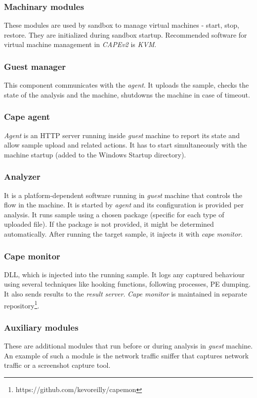 \subsubsection*{Machinary modules}
These modules are used by sandbox to manage virtual machines - start, stop, restore. They are initialized during sandbox startup. Recommended  software for virtual machine management in \emph{CAPEv2} is \emph{KVM}.

\subsubsection*{Guest manager}
This component communicates with the \emph{agent}. It uploads the sample, checks the state of the analysis and the machine, shutdowns the machine in case of timeout.

\subsubsection*{Cape agent}
\emph{Agent} is an HTTP server running inside \emph{guest} machine to report its state and allow sample upload and related actions. It has to start simultaneously with the machine startup (added to the Windows Startup directory).

\subsubsection*{Analyzer}
It is a platform-dependent software running in \emph{guest} machine that controls the flow in the machine. It is started by \emph{agent} and its configuration is provided per analysis. It runs sample using a chosen package (specific for each type of uploaded file). If the package is not provided, it might be determined automatically. After running the target sample, it injects it with \emph{cape monitor}.

\subsubsection*{Cape monitor}
DLL, which is injected into the running sample. It logs any captured behaviour using several techniques like hooking functions, following processes, PE dumping. It also sends results to the \emph{result server}. \emph{Cape monitor} is maintained in separate repository\footnote{https://github.com/kevoreilly/capemon}.

\subsubsection*{Auxiliary modules}
These are additional modules that run before or during analysis in \emph{guest} machine. An example of such a module is the network traffic sniffer that captures network traffic or a screenshot capture tool.

